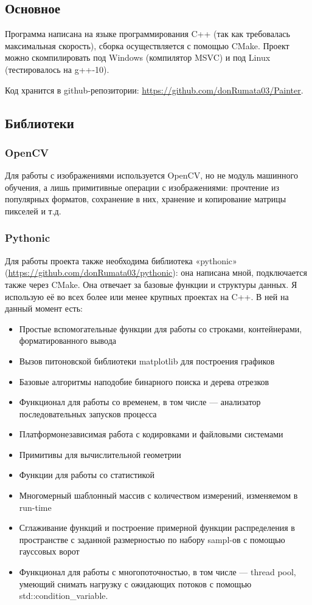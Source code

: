 \subsection{Основное}\label{subsec:major}
Программа написана на языке программирования C++ (так как требовалась максимальная скорость), сборка осуществляется с помощью CMake.
Проект можно скомпилировать под Windows (компилятор MSVC) и под Linux (тестировалось на g++-10).

Код хранится в github-репозитории: \url{https://github.com/donRumata03/Painter}.

\subsection{Библиотеки}\label{subsec:libs}

\subsubsection{OpenCV}
Для работы с изображениями используется OpenCV, но не модуль машинного обучения, а лишь примитивные операции с изображениями:
прочтение из популярных форматов, сохранение в них, хранение и копирование матрицы пикселей и т.д.

\subsubsection{Pythonic}
Для работы проекта также необходима библиотека «pythonic» (\url{https://github.com/donRumata03/pythonic}):
она написана мной, подключается также через CMake.
Она отвечает за базовые функции и структуры данных.
Я использую её во всех более или менее крупных проектах на C++.
В ней на данный момент есть:
\begin{itemize}
    \item Простые вспомогательные функции для работы со строками, контейнерами, форматированного вывода
    \item Вызов питоновской библиотеки matplotlib для построения графиков
    \item Базовые алгоритмы наподобие бинарного поиска и дерева отрезков
    \item Функционал для работы со временем, в том числе — анализатор последовательных запусков процесса
    \item Платформонезависимая работа с кодировками и файловыми системами
    \item Примитивы для вычислительной геометрии
    \item Функции для работы со статистикой
    \item Многомерный шаблонный массив с количеством измерений, изменяемом в run-time
    \item Сглаживание функций и построение примерной функции распределения в пространстве с заданной размерностью по набору sampl-ов с помощью гауссовых ворот
    \item Функционал для работы с многопоточностью, в том числе — thread pool, умеющий снимать нагрузку с ожидающих потоков с помощью std::condition\_variable.
\end{itemize}

